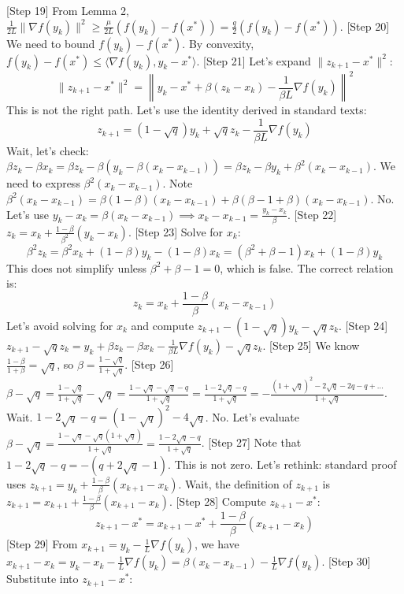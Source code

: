\documentclass{article}
\begin{document}
[Step 19] From Lemma 2, $\frac{1}{2L}\|\nabla f(y_k)\|^2 \ge \frac{\mu}{2L}(f(y_k) - f(x^*)) = \frac{q}{2}(f(y_k) - f(x^*))$.
[Step 20] We need to bound $f(y_k) - f(x^*)$.
By convexity, $f(y_k) - f(x^*) \le \langle \nabla f(y_k), y_k - x^* \rangle$.
[Step 21] Let's expand $\|z_{k+1} - x^*\|^2$:
$$ \|z_{k+1} - x^*\|^2 = \left\| y_k - x^* + \beta(z_k - x_k) - \frac{1}{\beta L}\nabla f(y_k) \right\|^2 $$
This is not the right path. Let's use the identity derived in standard texts:
$$ z_{k+1} = (1-\sqrt{q})y_k + \sqrt{q}z_k - \frac{1}{\beta L}\nabla f(y_k) $$
Wait, let's check: $\beta z_k - \beta x_k = \beta z_k - \beta(y_k - \beta(x_k - x_{k-1})) = \beta z_k - \beta y_k + \beta^2(x_k - x_{k-1})$.
We need to express $\beta^2(x_k - x_{k-1})$. Note $\beta^2(x_k - x_{k-1}) = \beta(1-\beta)(x_k - x_{k-1}) + \beta(\beta - 1 + \beta)(x_k - x_{k-1})$. No.
Let's use $y_k - x_k = \beta(x_k - x_{k-1}) \implies x_k - x_{k-1} = \frac{y_k - x_k}{\beta}$.
[Step 22] $z_k = x_k + \frac{1-\beta}{\beta^2}(y_k - x_k)$.
[Step 23] Solve for $x_k$:
$$ \beta^2 z_k = \beta^2 x_k + (1-\beta)y_k - (1-\beta)x_k = (\beta^2 + \beta - 1)x_k + (1-\beta)y_k $$
This does not simplify unless $\beta^2 + \beta - 1 = 0$, which is false. The correct relation is:
$$ z_k = x_k + \frac{1-\beta}{\beta}(x_k - x_{k-1}) $$
Let's avoid solving for $x_k$ and compute $z_{k+1} - (1-\sqrt{q})y_k - \sqrt{q}z_k$.
[Step 24] $z_{k+1} - \sqrt{q}z_k = y_k + \beta z_k - \beta x_k - \frac{1}{\beta L}\nabla f(y_k) - \sqrt{q}z_k$.
[Step 25] We know $\frac{1-\beta}{1+\beta} = \sqrt{q}$, so $\beta = \frac{1-\sqrt{q}}{1+\sqrt{q}}$.
[Step 26] $\beta - \sqrt{q} = \frac{1-\sqrt{q}}{1+\sqrt{q}} - \sqrt{q} = \frac{1-\sqrt{q} - \sqrt{q} - q}{1+\sqrt{q}} = \frac{1 - 2\sqrt{q} - q}{1+\sqrt{q}} = -\frac{(1+\sqrt{q})^2 - 2\sqrt{q} - 2q - q + \dots}{1+\sqrt{q}}$. Wait.
$1 - 2\sqrt{q} - q = (1-\sqrt{q})^2 - 4\sqrt{q}$. No.
Let's evaluate $\beta - \sqrt{q} = \frac{1-\sqrt{q} - \sqrt{q}(1+\sqrt{q})}{1+\sqrt{q}} = \frac{1 - 2\sqrt{q} - q}{1+\sqrt{q}}$.
[Step 27] Note that $1 - 2\sqrt{q} - q = -(q + 2\sqrt{q} - 1)$. This is not zero.
Let's rethink: standard proof uses $z_{k+1} = y_k + \frac{1-\beta}{\beta}(x_{k+1} - x_k)$.
Wait, the definition of $z_{k+1}$ is $z_{k+1} = x_{k+1} + \frac{1-\beta}{\beta}(x_{k+1} - x_k)$.
[Step 28] Compute $z_{k+1} - x^*$:
$$ z_{k+1} - x^* = x_{k+1} - x^* + \frac{1-\beta}{\beta}(x_{k+1} - x_k) $$
[Step 29] From $x_{k+1} = y_k - \frac{1}{L}\nabla f(y_k)$, we have $x_{k+1} - x_k = y_k - x_k - \frac{1}{L}\nabla f(y_k) = \beta(x_k - x_{k-1}) - \frac{1}{L}\nabla f(y_k)$.
[Step 30] Substitute into $z_{k+1} - x^*$:
\end{document}
